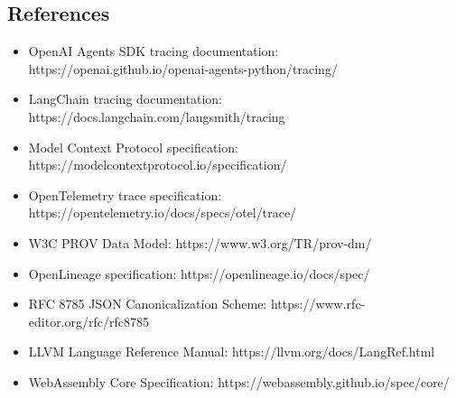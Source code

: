\documentclass[
]{article}
\providecommand{\tightlist}{%
  \setlength{\itemsep}{0pt}\setlength{\parskip}{0pt}}
\begin{document}
\subsection{References}\label{references}

\begin{itemize}
\tightlist
\item
  OpenAI Agents SDK tracing documentation:
  https://openai.github.io/openai-agents-python/tracing/
\item
  LangChain tracing documentation:
  https://docs.langchain.com/langsmith/tracing
\item
  Model Context Protocol specification:
  https://modelcontextprotocol.io/specification/
\item
  OpenTelemetry trace specification:
  https://opentelemetry.io/docs/specs/otel/trace/
\item
  W3C PROV Data Model: https://www.w3.org/TR/prov-dm/
\item
  OpenLineage specification: https://openlineage.io/docs/spec/
\item
  RFC 8785 JSON Canonicalization Scheme:
  https://www.rfc-editor.org/rfc/rfc8785
\item
  LLVM Language Reference Manual: https://llvm.org/docs/LangRef.html
\item
  WebAssembly Core Specification:
  https://webassembly.github.io/spec/core/
\end{itemize}
\end{document}
